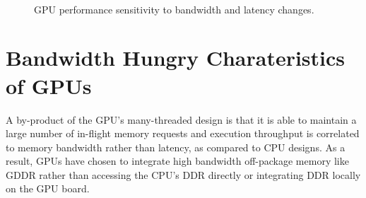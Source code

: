 \begin{figure}[t]
    \\
    \caption{GPU performance sensitivity to bandwidth and latency changes.}
    \label{fig:bwlatencysensitivity}
\end{figure}

\section{Bandwidth Hungry Charateristics of GPUs}
A by-product of the GPU's many-threaded design is that it is able to maintain a
large number of in-flight memory requests and execution throughput is correlated
to memory bandwidth rather than latency, as compared to CPU designs.  As a
result, GPUs have chosen to integrate high bandwidth off-package memory like
GDDR rather than accessing the CPU's DDR directly or integrating DDR locally on
the GPU board. 

